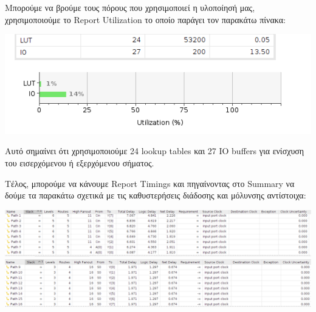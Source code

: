 \documentclass[11pt, a4paper]{report}
\begin{document}
Μπορούμε να βρούμε τους πόρους που χρησιμοποιεί η υλοποίησή μας, χρησιμοποιούμε το Report Utilization το οποίο παράγει τον παρακάτω πίνακα:
\begin{center}
  \includegraphics[width=\textwidth]{./images/alu-1/Joe_Utilization.png}
\end{center}

Αυτό σημαίνει ότι χρησιμοποιούμε 24 lookup tables και 27 IO buffers για ενίσχυση του εισερχόμενου ή εξερχόμενου σήματος.

Τέλος, μπορούμε να κάνουμε Report Timings και πηγαίνοντας στο Summary να δούμε τα παρακάτω σχετικά με τις καθυστερήσεις διάδοσης και μόλυνσης αντίστοιχα:
\begin{center}
  \includegraphics[width=\textwidth]{./images/alu-1/Joe_Setup_Time_Summury.png}
  \includegraphics[width=\textwidth]{./images/alu-1/Joe_Hold_Time_Summury.png}
\end{center}
\end{document}
